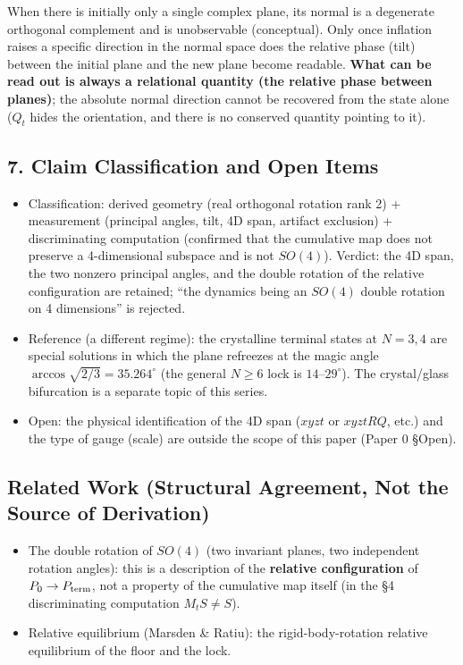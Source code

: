 \documentclass[
  a4paper,
]{ltjsarticle}
\providecommand{\tightlist}{%
  \setlength{\itemsep}{0pt}\setlength{\parskip}{0pt}}
\begin{document}
When there is initially only a single complex plane, its normal is a
degenerate orthogonal complement and is unobservable (conceptual). Only
once inflation raises a specific direction in the normal space does the
relative phase (tilt) between the initial plane and the new plane become
readable. \textbf{What can be read out is always a relational quantity
(the relative phase between planes)}; the absolute normal direction
cannot be recovered from the state alone (\(Q_t\) hides the orientation,
and there is no conserved quantity pointing to it).

\subsection{7. Claim Classification and Open
Items}\label{claim-classification-and-open-items}

\begin{itemize}
\tightlist
\item
  Classification: derived geometry (real orthogonal rotation rank 2) +
  measurement (principal angles, tilt, 4D span, artifact exclusion) +
  discriminating computation (confirmed that the cumulative map does not
  preserve a 4-dimensional subspace and is not \(SO(4)\)). Verdict: the
  4D span, the two nonzero principal angles, and the double rotation of
  the relative configuration are retained; ``the dynamics being an
  \(SO(4)\) double rotation on 4 dimensions'' is rejected.
\item
  Reference (a different regime): the crystalline terminal states at
  \(N=3,4\) are special solutions in which the plane refreezes at the
  magic angle \(\arccos\sqrt{2/3}=35.264^\circ\) (the general \(N\ge6\)
  lock is \(14\)--\(29^\circ\)). The crystal/glass bifurcation is a
  separate topic of this series.
\item
  Open: the physical identification of the 4D span (\(xyzt\) or
  \(xyztRQ\), etc.) and the type of gauge (scale) are outside the scope
  of this paper (Paper 0 §Open).
\end{itemize}

\subsection{Related Work (Structural Agreement, Not the Source of
Derivation)}\label{related-work-structural-agreement-not-the-source-of-derivation}

\begin{itemize}
\tightlist
\item
  The double rotation of \(SO(4)\) (two invariant planes, two
  independent rotation angles): this is a description of the
  \textbf{relative configuration} of \(P_0\to P_{\rm term}\), not a
  property of the cumulative map itself (in the §4 discriminating
  computation \(M_tS\neq S\)).
\item
  Relative equilibrium (Marsden \& Ratiu): the rigid-body-rotation
  relative equilibrium of the floor and the lock.
\end{itemize}
\end{document}
